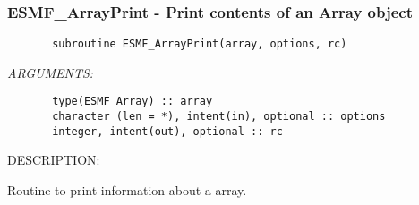 \subsubsection [ESMF\_ArrayPrint] {ESMF\_ArrayPrint - Print contents of an Array object}


  
\begin{verbatim}       subroutine ESMF_ArrayPrint(array, options, rc)\end{verbatim}{\em ARGUMENTS:}
\begin{verbatim}       type(ESMF_Array) :: array
       character (len = *), intent(in), optional :: options
       integer, intent(out), optional :: rc\end{verbatim}
{\sf DESCRIPTION:\\ }


   Routine to print information about a array.
  
